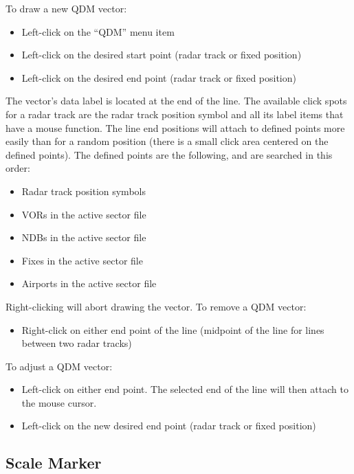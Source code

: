 \documentclass[11pt,a4paper,oldfontcommands]{memoir}
\begin{document}
To draw a new QDM vector:
\begin{itemize}
    \item Left-click on the “QDM” menu item
    \item Left-click on the desired start point (radar track or fixed position)
    \item Left-click on the desired end point (radar track or fixed position)
\end{itemize}

The vector’s data label is located at the end of the line. The available click spots for a radar track are the radar track position symbol and all its label items that have a mouse function.
The line end positions will attach to defined points more easily than for a random position (there is a small click area centered on the defined points). The defined points are the following, and are searched in this order:

\begin{itemize}
    \item Radar track position symbols
    \item VORs in the active sector file
    \item NDBs in the active sector file
    \item Fixes in the active sector file
    \item Airports in the active sector file
\end{itemize}

Right-clicking will abort drawing the vector.
To remove a QDM vector:

\begin{itemize}
    \item Right-click on either end point of the line (midpoint of the line for lines between two radar tracks)
\end{itemize}

To adjust a QDM vector:

\begin{itemize}
    \item Left-click on either end point. The selected end of the line will then attach to the mouse cursor.
    \item Left-click on the new desired end point (radar track or fixed position)
\end{itemize}

\subsection{Scale Marker}
\label{scale}
\end{document}
